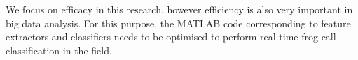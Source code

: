 \begin{itemize}
We focus on efficacy in this research, however efficiency is also very important in big data analysis. For this purpose, the MATLAB code corresponding to feature extractors and classifiers needs to be optimised to perform real-time frog call classification in the field.


\end{itemize}










